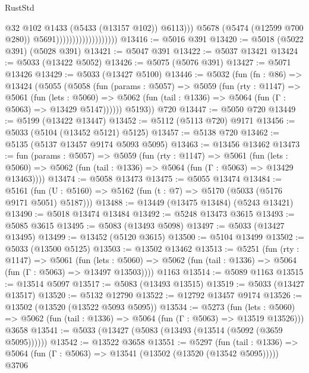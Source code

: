 \begin{lexlean}{RustStd}
\begin{coremodule}
                                                @32
                                                @102
                                                @1433
                                                (@5433 (@13157 @102))
                                                @6113)))
                                          @5678
                                          (@5474 (@12599 @700 @280))
                                          @5691)))))))))))))))))))
@13416 := @5016 @391
@13420 := @5018 (@5022 @391) (@5028 @391)
@13421 := @5047 @391
@13422 := @5037 @13421
@13424 := @5033 (@13422 @5052)
@13426 := @5075 (@5076 @391)
@13427 := @5071 @13426
@13429 := @5033 (@13427 @5100)
@13446 := @5032
    (fun (fn : @86) =>
    @13424
      (@5055
        (@5058
          (fun (params : @5057) =>
          @5059
            (fun (rty : @1147) =>
            @5061
              (fun (lets : @5060) =>
              @5062 (fun (tail : @1336) => @5064 (fun (Γ : @5063) => @13429 @5147))))))
        @5193))
    @720
@13447 := @5050 @720
@13449 := @5199 (@13422 @13447)
@13452 := @5112 (@5113 @720) @9171
@13456 := @5033 (@5104 (@13452 @5121) @5125)
@13457 := @5138 @720
@13462 := @5135 (@5137 @13457 @9174 @5093 @5095)
@13463 := @13456 @13462
@13473 := fun (params : @5057) =>
  @5059
    (fun (rty : @1147) =>
    @5061
      (fun (lets : @5060) =>
      @5062 (fun (tail : @1336) => @5064 (fun (Γ : @5063) => @13429 @13463))))
@13474 := @5058 @13473
@13475 := @5055 @13474
@13484 := @5161 (fun (U : @5160) => @5162 (fun (t : @7) => @5170 (@5033 (@5176 @9171 @5051) @5187)))
@13488 := @13449 (@13475 @13484) (@5243 @13421)
@13490 := @5018 @13474 @13484
@13492 := @5248 @13473 @3615
@13493 := @5085 @3615
@13495 := @5083 (@13493 @5098)
@13497 := @5033 (@13427 @13495)
@13499 := @13452 (@5120 @3615)
@13500 := @5104 @13499
@13502 := @5033 (@13500 @5125)
@13503 := @13502 @13462
@13513 := @5251
    (fun (rty : @1147) =>
    @5061
      (fun (lets : @5060) =>
      @5062 (fun (tail : @1336) => @5064 (fun (Γ : @5063) => @13497 @13503))))
    @1163
@13514 := @5089 @1163
@13515 := @13514 @5097
@13517 := @5083 (@13493 @13515)
@13519 := @5033 (@13427 @13517)
@13520 := @5132 @12790
@13522 := @12792 @13457 @9174
@13526 := @13502 (@13520 (@13522 @5093 @5095))
@13534 := @5273
    (fun (lets : @5060) => @5062 (fun (tail : @1336) => @5064 (fun (Γ : @5063) => @13519 @13526)))
    @3658
@13541 := @5033 (@13427 (@5083 (@13493 (@13514 (@5092 (@3659 @5095))))))
@13542 := @13522 @3658
@13551 := @5297
    (fun (tail : @1336) => @5064 (fun (Γ : @5063) => @13541 (@13502 (@13520 (@13542 @5095)))))
    @3706

\end{coremodule}
\end{lexlean}
